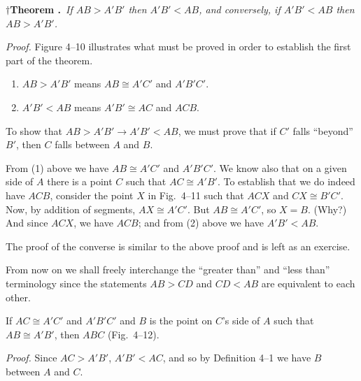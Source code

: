 \documentclass[11pt]{book}
\begin{document}
%
\par\medskip\noindent
\textbf{$\dagger$Theorem \thetheorem.}\ \emph{If $AB > A'B'$ then
$A'B' < AB$, and conversely, if $A'B' < AB$ then $AB > A'B'$.}%
\begingroup\let\thefootnote\relax
{}%
\endgroup
\par\medskip

\noindent\emph{Proof.} Figure 4--10 illustrates what must be proved in order to
establish the first part of the theorem.

\begin{enumerate}[label=(\arabic*), leftmargin=2.2em, itemsep=1pt, topsep=3pt]
\item $AB > A'B'$ means $AB \cong A'C'$ and $A'B'C'$.
\item $A'B' < AB$ means $A'B' \cong AC$ and $ACB$.
\end{enumerate}

\FIGIVTENELEVEN

To show that $AB > A'B' \rightarrow A'B' < AB$, we must prove that if $C'$ falls
``beyond'' $B'$, then $C$ falls between $A$ and $B$.

From (1) above we have $AB \cong A'C'$ and $A'B'C'$. We know also that on a
given side of $A$ there is a point $C$ such that $AC \cong A'B'$. To establish
that we do indeed have $ACB$, consider the point $X$ in Fig.~4--11 such that
$ACX$ and $CX \cong B'C'$. Now, by addition of segments, $AX \cong A'C'$. But
$AB \cong A'C'$, so $X = B$. (Why?) And since $ACX$, we have $ACB$; and from (2)
above we have $A'B' < AB$.

The proof of the converse is similar to the above proof and is left as an
exercise.

From now on we shall freely interchange the ``greater than'' and ``less than''
terminology since the statements $AB > CD$ and $CD < AB$ are equivalent to each
other.

\begin{theorem}
If $AC \cong A'C'$ and $A'B'C'$ and $B$ is the point on $C$'s side of $A$ such
that $AB \cong A'B'$, then $ABC$ (Fig.~4--12).
\end{theorem}

\noindent\emph{Proof.} Since $AC > A'B'$, $A'B' < AC$, and so by Definition 4--1
we have $B$ between $A$ and $C$.
\end{document}
